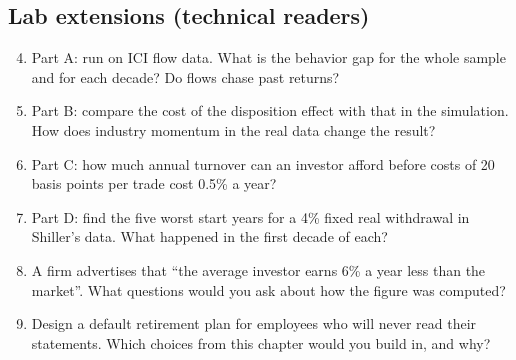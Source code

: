 \subsection*{Lab extensions (technical readers)}

\begin{enumerate}
  \setcounter{enumi}{3}
  \item Part A: run on ICI flow data. What is the behavior gap for the whole sample and for each decade? Do flows chase past returns?
  \item Part B: compare the cost of the disposition effect with that in the simulation. How does industry momentum in the real data change the result?
  \item Part C: how much annual turnover can an investor afford before costs of 20 basis points per trade cost 0.5\% a year?
  \item Part D: find the five worst start years for a 4\% fixed real withdrawal in Shiller's data. What happened in the first decade of each?
  \item A firm advertises that ``the average investor earns 6\% a year less than the market''. What questions would you ask about how the figure was computed?
  \item Design a default retirement plan for employees who will never read their statements. Which choices from this chapter would you build in, and why?
\end{enumerate}
